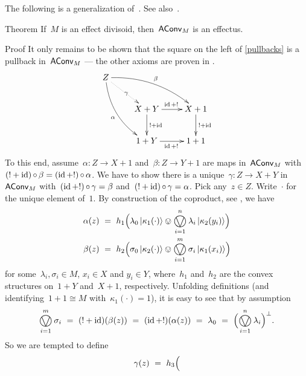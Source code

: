 \documentclass[b]{subfiles}
\begin{document}
\begin{parsec}%
\begin{point}%
The following is a generalization
of~\cite[Prop.~C.3]{kentapartial}.
See also~\cite[Prop.~15]{statesofconvexsets}.
\end{point}
\begin{point}{Theorem}%
If~$M$ is an effect divisoid,
    then~$\mathsf{AConv}_M$ is an effectus.
\begin{point}{Proof}%
It only remains to be shown that the square on the left
    of \eqref{pullbacks} is a pullback in~$\mathsf{AConv}_M$
    --- the other axioms are proven in .
\begin{equation*}
\xymatrix{
    Z \ar@/^1pc/[rrd]^\beta
        \ar@/_1pc/[rdd]_\alpha
        \ar@{.>}[rd]|\gamma\\
        &X+Y \ar[r]^{\id+!} \ar[d]^{!+\id} & X+1\ar[d]^{!+\id} \\
        &1+Y\ar[r]_{\id+!} & 1+1
    }
\end{equation*}
To this end, assume~$\alpha\colon Z \to X+1$
and~$\beta\colon Z \to Y+1$
are maps in~$\mathsf{AConv}_M$
with~$(! + \operatorname{id}) \mathop{\circ} \beta = (\operatorname{id}+!)\mathop{\circ} \alpha$.
We have to show there is a unique~$\gamma\colon Z \to X+Y$ in~$\mathsf{AConv}_M$
with~$(\operatorname{id}+!)\mathop{\circ} \gamma =\beta$
and~$(!+\operatorname{id}) \mathop{\circ} \gamma =\alpha$.
Pick any~$z \in Z$.
Write~$\cdot$ for the unique element of~$1$.
By construction of the coproduct, see ,
we have
\begin{align*}
    \alpha(z) &\ =\  h_1\Bigl(\lambda_0 \ket{\kappa_1(\cdot)}
    \ovee \bigovee^n_{i=1} \lambda_i \ket{\kappa_2(y_i)}\Bigr) \\
        \beta(z) &\ =\  h_2 \Bigl(\sigma_0 \ket{\kappa_2(\cdot)}
        \ovee \bigovee^m_{i=1} \sigma_i \ket{\kappa_1(x_i)}\Bigr)
\end{align*}
for some~$\lambda_i, \sigma_i \in M$,
    $x_i \in X$ and $y_i \in Y$,
    where~$h_1$ and~$h_2$ are the convex structures
    on~$1+Y$ and~$X+1$, respectively.
Unfolding definitions
    (and identifying~$1+1 \cong M$ with~$\kappa_1 (\cdot) = 1$),
    it is easy to
    see that by assumption
\begin{equation}\label{aconv-epb-ass}
    \bigovee^m_{i=1} \sigma_i \ = \ 
    (!+\id)(\beta(z))  \ = \ 
    (\id + !)(\alpha(z)) \ =\  \lambda_0
    \ = \ \Bigl(\bigovee^n_{i=1} \lambda_i\Bigr)^\perp.
\end{equation}
So we are tempted to define
\begin{equation}\label{aconvmexpuldefgamma}
    \gamma(z) \ = \  h_3 \Bigl(

\end{equation}
\end{point}
\end{point}
\end{parsec}
\end{document}
